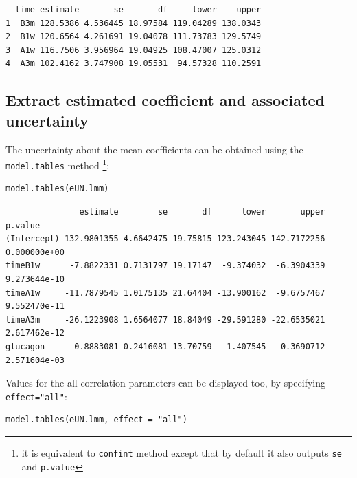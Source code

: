 \documentclass[12pt]{article}
\begin{document}
\begin{verbatim}
  time estimate       se       df     lower    upper
1  B3m 128.5386 4.536445 18.97584 119.04289 138.0343
2  B1w 120.6564 4.261691 19.04078 111.73783 129.5749
3  A1w 116.7506 3.956964 19.04925 108.47007 125.0312
4  A3m 102.4162 3.747908 19.05531  94.57328 110.2591
\end{verbatim}

\subsection{Extract estimated coefficient and associated uncertainty}
\label{sec:orgd48964e}

The uncertainty about the mean coefficients can be obtained using the
\texttt{model.tables} method \footnote{it is equivalent to \texttt{confint} method
except that by default it also outputs \texttt{se} and \texttt{p.value}}:
\lstset{language=r,label= ,caption= ,captionpos=b,numbers=none}
\begin{lstlisting}
model.tables(eUN.lmm)
\end{lstlisting}

\begin{verbatim}
               estimate        se       df      lower       upper      p.value
(Intercept) 132.9801355 4.6642475 19.75815 123.243045 142.7172256 0.000000e+00
timeB1w      -7.8822331 0.7131797 19.17147  -9.374032  -6.3904339 9.273644e-10
timeA1w     -11.7879545 1.0175135 21.64404 -13.900162  -9.6757467 9.552470e-11
timeA3m     -26.1223908 1.6564077 18.84049 -29.591280 -22.6535021 2.617462e-12
glucagon     -0.8883081 0.2416081 13.70759  -1.407545  -0.3690712 2.571604e-03
\end{verbatim}


Values for the all correlation parameters can be displayed
too, by specifying \texttt{effect="all"}:
\lstset{language=r,label= ,caption= ,captionpos=b,numbers=none}
\begin{lstlisting}
model.tables(eUN.lmm, effect = "all")
\end{lstlisting}
\end{document}
